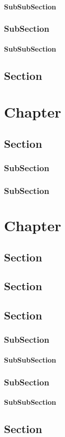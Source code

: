 \subsubsection{SubSubSection}

\subsection{SubSection}
\subsubsection{SubSubSection}


\section{Section}



\chapter{Chapter}

\section{Section}

\subsection{SubSection}

\subsection{SubSection}



\chapter{Chapter}

\section{Section}
\section{Section}
\section{Section}

\subsection{SubSection}
\subsubsection{SubSubSection}

\subsection{SubSection}
\subsubsection{SubSubSection}

\section{Section}
